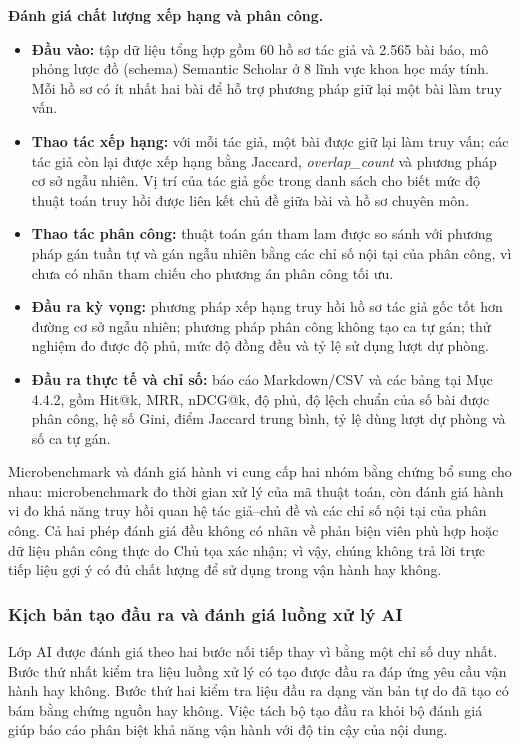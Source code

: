 \textbf{Đánh giá chất lượng xếp hạng và phân công.}

\begin{itemize}
  \item \textbf{Đầu vào:} tập dữ liệu tổng hợp  gồm 60 hồ sơ tác giả và 2.565 bài báo, mô phỏng lược đồ (schema) Semantic Scholar ở 8 lĩnh vực khoa học máy tính. Mỗi hồ sơ có ít nhất hai bài để hỗ trợ phương pháp giữ lại một bài làm truy vấn.
  \item \textbf{Thao tác xếp hạng:} với mỗi tác giả, một bài được giữ lại làm truy vấn; các tác giả còn lại được xếp hạng bằng Jaccard, \textit{overlap\_count} và phương pháp cơ sở ngẫu nhiên. Vị trí của tác giả gốc trong danh sách cho biết mức độ thuật toán truy hồi được liên kết chủ đề giữa bài và hồ sơ chuyên môn.
  \item \textbf{Thao tác phân công:} thuật toán gán tham lam được so sánh với phương pháp gán tuần tự và gán ngẫu nhiên bằng các chỉ số nội tại của phân công, vì chưa có nhãn tham chiếu cho phương án phân công tối ưu.
  \item \textbf{Đầu ra kỳ vọng:} phương pháp xếp hạng truy hồi hồ sơ tác giả gốc tốt hơn đường cơ sở ngẫu nhiên; phương pháp phân công không tạo ca tự gán; thử nghiệm đo được độ phủ, mức độ đồng đều và tỷ lệ sử dụng lượt dự phòng.
  \item \textbf{Đầu ra thực tế và chỉ số:} báo cáo Markdown/CSV và các bảng tại Mục 4.4.2, gồm Hit@k, MRR, nDCG@k, độ phủ, độ lệch chuẩn của số bài được phân công, hệ số Gini, điểm Jaccard trung bình, tỷ lệ dùng lượt dự phòng và số ca tự gán.
\end{itemize}

Microbenchmark và đánh giá hành vi cung cấp hai nhóm bằng chứng bổ sung cho nhau: microbenchmark đo thời gian xử lý của mã thuật toán, còn đánh giá hành vi đo khả năng truy hồi quan hệ tác giả--chủ đề và các chỉ số nội tại của phân công. Cả hai phép đánh giá đều không có nhãn về phản biện viên phù hợp hoặc dữ liệu phân công thực do Chủ tọa xác nhận; vì vậy, chúng không trả lời trực tiếp liệu gợi ý có đủ chất lượng để sử dụng trong vận hành hay không.

\subsubsection{Kịch bản tạo đầu ra và đánh giá luồng xử lý AI}

Lớp AI được đánh giá theo hai bước nối tiếp thay vì bằng một chỉ số duy nhất. Bước thứ nhất kiểm tra liệu luồng xử lý có tạo được đầu ra đáp ứng yêu cầu vận hành hay không. Bước thứ hai kiểm tra liệu đầu ra dạng văn bản tự do đã tạo có bám bằng chứng nguồn hay không. Việc tách bộ tạo đầu ra khỏi bộ đánh giá giúp báo cáo phân biệt khả năng vận hành với độ tin cậy của nội dung.

